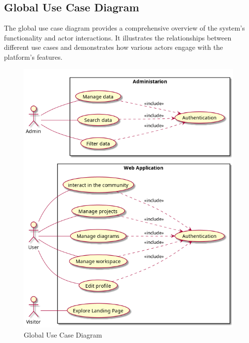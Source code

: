 \subsection{Global Use Case Diagram}

The global use case diagram provides a comprehensive overview of the system's functionality and actor interactions. It illustrates the relationships between different use cases and demonstrates how various actors engage with the platform's features.

\begin{figure}[H]
    \centering
    \includegraphics[width=\textwidth]{./conception/global_use_case_diagram.png}
    \caption{Global Use Case Diagram}
    \label{fig:global_use_case}
\end{figure}


